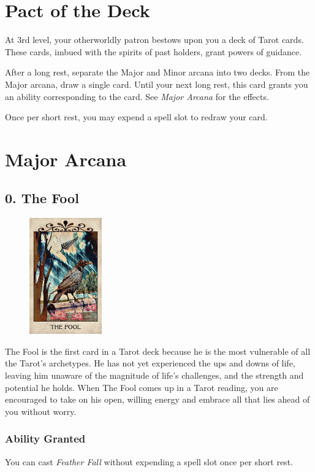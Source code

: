 \documentclass[10pt,twoside,twocolumn,openany,nodeprecatedcode]{dndbook}
\begin{document}
    \section*{Pact of the Deck}
    At 3rd level, your otherworldly patron bestows upon you a deck of Tarot cards.
    These cards, imbued with the spirits of past holders, grant powers of guidance.
    
    After a long rest, separate the Major and Minor arcana into two decks. From the Major arcana,
    draw a single card. Until your next long rest, this card grants you an ability corresponding to the card.
    See \emph{Major Arcana} for the effects.

    Once per short rest, you may expend a spell slot to redraw your card.

    \section*{Major Arcana}
    \subsection*{0. The Fool}

    \begin{figure}
        \includegraphics[height=5cm,width=\linewidth]{fool.jpg}
    \end{figure}
    The Fool is the first card in a Tarot deck because he is the most vulnerable of all the Tarot's archetypes. He has not yet experienced the ups and downs of life, leaving him unaware of the magnitude of life's challenges, and the strength and potential he holds. When The Fool comes up in a Tarot reading, you are encouraged to take on his open, willing energy and embrace all that lies ahead of you without worry.

    \subsubsection*{Ability Granted}
    You can cast \emph{Feather Fall} without expending a spell slot once per short rest.
\end{document}
